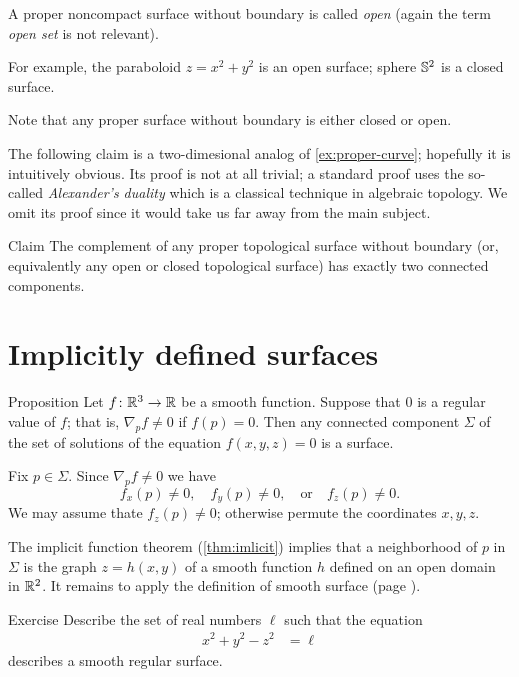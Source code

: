 A proper noncompact surface without boundary is called \emph{open} (again the term {}\emph{open set} is not relevant).

For example, the paraboloid $z=x^2+y^2$
is an open surface; 
sphere $\mathbb{S}^2$ is a closed surface.

Note that any proper surface without boundary is either closed or open.

The following claim is a two-dimesional analog of \ref{ex:proper-curve};
hopefully it is intuitively obvious. 
Its proof is not at all trivial; a standard proof uses the so-called \emph{Alexander's duality} which is a classical technique in algebraic topology. %
We omit its proof since it would take us far away from the main subject.

\begin{thm}{Claim}\label{clm:proper-divides}
The complement of any proper topological surface without boundary (or, equivalently any open or closed topological surface) has exactly two connected components. 
\end{thm}

\section{Implicitly defined surfaces}

\begin{thm}{Proposition}\label{prop:implicit-surface}
Let $f\colon\mathbb{R}^3\to \mathbb{R}$ be a smooth function.
Suppose that $0$ is a regular value of $f$;
that is, $\nabla_p f\ne 0$ if $f(p)=0$.
Then any connected component $\Sigma$ of the set of solutions of the equation $f(x,y,z)=0$ is a surface.
\end{thm}

Fix $p\in\Sigma$.
Since $\nabla_p f\ne 0$ we have 
\[f_x(p)\ne 0,\quad f_y(p)\ne 0,\quad \text{or}\quad f_z(p)\ne 0.\]
We may assume thate $f_z(p)\ne 0$;
otherwise permute the coordinates $x,y,z$.

The implicit function theorem (\ref{thm:imlicit}) implies that a neighborhood of $p$ in $\Sigma$ is the graph $z=h(x,y)$ of a smooth function $h$ defined on an open domain in $\mathbb{R}^2$.
It remains to apply the definition of smooth surface (page \pageref{page:def-smooth-surface}).
\qeds

\begin{thm}{Exercise}\label{ex:hyperboloinds}
Describe the set of real numbers $\ell$
such that the equation
\begin{align*}
x^2+y^2-z^2&=\ell
\end{align*}
describes a smooth regular surface.
\end{thm}

